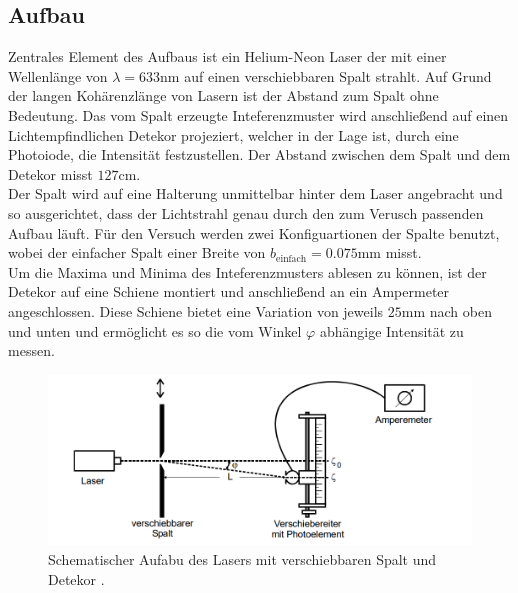 \subsection{Aufbau}
Zentrales Element des Aufbaus ist ein Helium-Neon Laser der mit einer Wellenlänge von $\lambda = 633\si{\nano \meter}$ auf einen
verschiebbaren Spalt strahlt. Auf Grund der langen Kohärenzlänge von Lasern ist der Abstand zum Spalt ohne Bedeutung.
Das vom Spalt erzeugte Inteferenzmuster wird anschließend auf einen Lichtempfindlichen Detekor projeziert, 
welcher in der Lage ist, durch eine Photoiode, die Intensität festzustellen. Der Abstand zwischen dem Spalt und 
dem Detekor misst $127\si{\cm}$. 
\\
\newline
Der Spalt wird auf eine Halterung unmittelbar hinter dem Laser angebracht und so ausgerichtet, dass der Lichtstrahl 
genau durch den zum Verusch passenden Aufbau läuft. Für den Versuch werden zwei Konfiguartionen der Spalte benutzt, wobei der 
einfacher Spalt einer Breite von $b_{\text{einfach}}=0.075 \si{\mm}$ misst.
\\
\newline
Um die Maxima und Minima des Inteferenzmusters ablesen zu können, ist der Detekor auf eine Schiene montiert und anschließend an ein 
Ampermeter angeschlossen. 
Diese Schiene bietet eine Variation von jeweils $25 \si{\mm}$ nach oben und unten und ermöglicht es so die vom Winkel
$\varphi$ abhängige Intensität zu messen.
\begin{figure}
    \centering
    \includegraphics[width=\textwidth]{bilder/aufbau.png}
    \caption{Schematischer Aufabu des Lasers mit verschiebbaren Spalt und Detekor \cite{skript}.} 
    \label{fig:abb1}
\end{figure}
